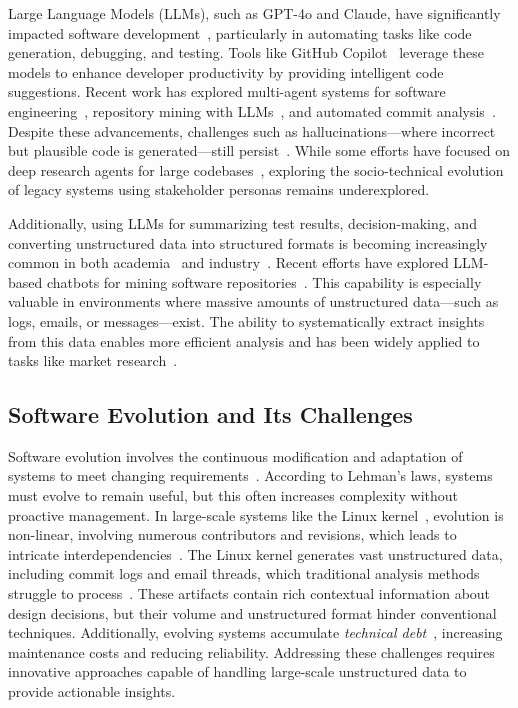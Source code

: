 \documentclass[sigconf,review,anonymous]{acmart}
\begin{document}
Large Language Models (LLMs), such as GPT-4o and Claude, have significantly impacted software development~\cite{jin2024llms}, particularly in automating tasks like code generation, debugging, and testing. Tools like GitHub Copilot~\cite{copilot} leverage these models to enhance developer productivity by providing intelligent code suggestions. Recent work has explored multi-agent systems for software engineering~\cite{lmase2024,agent4se2024}, repository mining with LLMs~\cite{primes2024}, and automated commit analysis~\cite{commitgen2024,apce2025}. Despite these advancements, challenges such as hallucinations—where incorrect but plausible code is generated—still persist~\cite{fan2023large,ji2023survey}. While some efforts have focused on deep research agents for large codebases~\cite{coderesearcher2025}, exploring the socio-technical evolution of legacy systems using stakeholder personas remains underexplored.

Additionally, using LLMs for summarizing test results, decision-making, and converting unstructured data into structured formats is becoming increasingly common in both academia~\cite{jin2024comprehensive,iourovitski2024grade,patel2024lotus} and industry~\cite{llmnvida}. Recent efforts have explored LLM-based chatbots for mining software repositories~\cite{llmchatbotsmsr2024}. This capability is especially valuable in environments where massive amounts of unstructured data—such as logs, emails, or messages—exist. The ability to systematically extract insights from this data enables more efficient analysis and has been widely applied to tasks like market research~\cite{brand2023using}.

\subsection{Software Evolution and Its Challenges}
Software evolution involves the continuous modification and adaptation of systems to meet changing requirements~\cite{lehman1996laws}. According to Lehman's laws, systems must evolve to remain useful, but this often increases complexity without proactive management. In large-scale systems like the Linux kernel~\cite{linux}, evolution is non-linear, involving numerous contributors and revisions, which leads to intricate interdependencies~\cite{israeli2010linux}. The Linux kernel generates vast unstructured data, including commit logs and email threads, which traditional analysis methods struggle to process~\cite{mens2008introduction}. These artifacts contain rich contextual information about design decisions, but their volume and unstructured format hinder conventional techniques. Additionally, evolving systems accumulate \emph{technical debt}~\cite{brown2010managing}, increasing maintenance costs and reducing reliability. Addressing these challenges requires innovative approaches capable of handling large-scale unstructured data to provide actionable insights.
\end{document}
